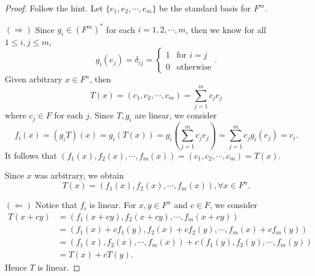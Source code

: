 \begin{Exercise}
\begin{proof}
Follow the hint. Let $\{e_1,e_2,\cdots,e_m\}$ be the standard basis for $F^m$.

$(\Longrightarrow)$
Since $g_i\in (F^m)^*$ for each $i=1,2,\cdots,m$, then we know for all $1\leq i,j\leq m$,
$$
g_i(e_j) = \delta_{i j} = \begin{cases}
1 & \mbox{for } i=j \\
0 & \mbox{otherwise}
\end{cases}.
$$
Given arbitrary $x\in F^n$, then
$$
T(x) = (c_1,c_2,\cdots,c_m) = \sum_{j=1}^{m} c_j e_j
$$
where $c_j \in F$ for each $j$. Since $T, g_i$ are linear, we consider
$$
f_i(x) = (g_i T)(x) = g_i(T(x)) = g_i(\sum_{j=1}^{m} c_j e_j) = \sum_{j=1}^{m} c_j g_i(e_j) = c_i.
$$
It follows that
$(f_1(x), f_2(x), \cdots, f_m(x)) = (c_1, c_2, \cdots, c_m) = T(x)$.

Since $x$ was arbitrary, we obtain
$$
T(x) = (f_1(x), f_2(x), \cdots, f_m(x)), \forall x\in F^n.
$$

\vspace{2ex}

$(\Longleftarrow)$
Notice that $f_i$ is linear. For $x,y \in F^n$ and $c\in F$, we consider
\begin{align*}
T(x+c y)
&= ( f_1(x+c y), f_2(x+c y), \cdots, f_m(x+c y) ) \\
&= ( f_1(x)+c f_1(y), f_2(x)+c f_2(y), \cdots, f_m(x)+c f_m(y) ) \\
&= ( f_1(x), f_2(x), \cdots, f_m(x) ) + c( f_1(y), f_2(y), \cdots, f_m(y) ) \\
&= T(x) + c T(y).
\end{align*}
Hence $T$ is linear.
\end{proof}
\end{Exercise}